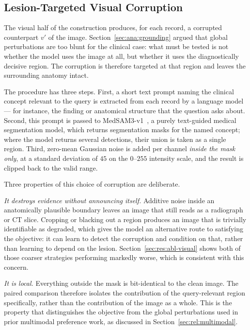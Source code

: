 \subsection{Lesion-Targeted Visual Corruption}
\label{sec:met:corruption}

The visual half of the construction produces, for each record, a corrupted counterpart $v'$ of the image. Section~\ref{sec:ana:grounding} argued that global perturbations are too blunt for the clinical case: what must be tested is not whether the model uses the image at all, but whether it uses the diagnostically decisive region. The corruption is therefore targeted at that region and leaves the surrounding anatomy intact.

The procedure has three steps. First, a short text prompt naming the clinical concept relevant to the query is extracted from each record by a language model --- for instance, the finding or anatomical structure that the question asks about. Second, this prompt is passed to MedSAM3-v1~\cite{liu2025medsam3}, a purely text-guided medical segmentation model, which returns segmentation masks for the named concept; where the model returns several detections, their union is taken as a single region. Third, zero-mean Gaussian noise is added per channel \emph{inside the mask only}, at a standard deviation of $45$ on the $0$--$255$ intensity scale, and the result is clipped back to the valid range.

Three properties of this choice of corruption are deliberate.

\emph{It destroys evidence without announcing itself.} Additive noise inside an anatomically plausible boundary leaves an image that still reads as a radiograph or CT slice. Cropping or blacking out a region produces an image that is trivially identifiable as degraded, which gives the model an alternative route to satisfying the objective: it can learn to detect the corruption and condition on that, rather than learning to depend on the lesion. Section~\ref{sec:res:abl-visual} shows both of those coarser strategies performing markedly worse, which is consistent with this concern.

\emph{It is local.} Everything outside the mask is bit-identical to the clean image. The paired comparison therefore isolates the contribution of the query-relevant region specifically, rather than the contribution of the image as a whole. This is the property that distinguishes the objective from the global perturbations used in prior multimodal preference work, as discussed in Section~\ref{sec:rel:multimodal}.


